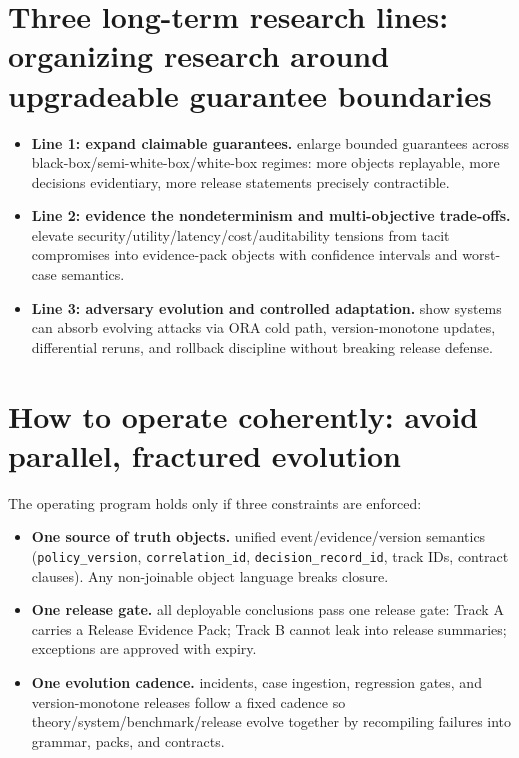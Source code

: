 \documentclass[11pt,a4paper]{report}
\begin{document}
\section{Three long-term research lines: organizing research around upgradeable guarantee boundaries}
\begin{itemize}
  \item \textbf{Line 1: expand claimable guarantees.} enlarge bounded guarantees across black-box/semi-white-box/white-box regimes: more objects replayable, more decisions evidentiary, more release statements precisely contractible.
  \item \textbf{Line 2: evidence the nondeterminism and multi-objective trade-offs.} elevate security/utility/latency/cost/auditability tensions from tacit compromises into evidence-pack objects with confidence intervals and worst-case semantics.
  \item \textbf{Line 3: adversary evolution and controlled adaptation.} show systems can absorb evolving attacks via ORA cold path, version-monotone updates, differential reruns, and rollback discipline without breaking release defense.
\end{itemize}

\section{How to operate coherently: avoid parallel, fractured evolution}
The operating program holds only if three constraints are enforced:
\begin{itemize}
  \item \textbf{One source of truth objects.} unified event/evidence/version semantics (\texttt{policy\_version}, \texttt{correlation\_id}, \texttt{decision\_record\_id}, track IDs, contract clauses). Any non-joinable object language breaks closure.
  \item \textbf{One release gate.} all deployable conclusions pass one release gate: Track A carries a Release Evidence Pack; Track B cannot leak into release summaries; exceptions are approved with expiry.
  \item \textbf{One evolution cadence.} incidents, case ingestion, regression gates, and version-monotone releases follow a fixed cadence so theory/system/benchmark/release evolve together by recompiling failures into grammar, packs, and contracts.
\end{itemize}

\end{document}
